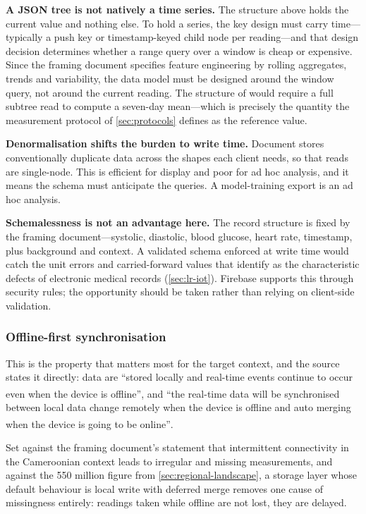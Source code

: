 \documentclass[12pt,a4paper,oneside]{report}
\newcommand{\bq}[1]{``#1''\textsuperscript{\dag}}
\begin{document}
\textbf{A JSON tree is not natively a time series.} The structure above holds the current value and nothing else. To hold a series, the key design must carry time---typically a push key or timestamp-keyed child node per reading---and that design decision determines whether a range query over a window is cheap or expensive. Since the framing document specifies feature engineering by rolling aggregates, trends and variability, the data model must be designed around the window query, not around the current reading. The structure of \textcite{efendi2025} would require a full subtree read to compute a seven-day mean---which is precisely the quantity the measurement protocol of \cref{sec:protocols} defines as the reference value.

\textbf{Denormalisation shifts the burden to write time.} Document stores conventionally duplicate data across the shapes each client needs, so that reads are single-node. This is efficient for display and poor for ad hoc analysis, and it means the schema must anticipate the queries. A model-training export is an ad hoc analysis.

\textbf{Schemalessness is not an advantage here.} The record structure is fixed by the framing document---systolic, diastolic, blood glucose, heart rate, timestamp, plus background and context. A validated schema enforced at write time would catch the unit errors and carried-forward values that \textcite{liu2025review} identify as the characteristic defects of electronic medical records (\cref{sec:lr-iot}). Firebase supports this through security rules; the opportunity should be taken rather than relying on client-side validation.

\subsubsection{Offline-first synchronisation}\label{sec:offline}

This is the property that matters most for the target context, and the source states it directly: data are \bq{stored locally and real-time events continue to occur even when the device is offline}, and \bq{the real-time data will be synchronised between local data change remotely when the device is offline and auto merging when the device is going to be online}.

Set against the framing document's statement that intermittent connectivity in the Cameroonian context leads to irregular and missing measurements, and against the 550 million figure from \cref{sec:regional-landscape}, a storage layer whose default behaviour is local write with deferred merge removes one cause of missingness entirely: readings taken while offline are not lost, they are delayed.
\end{document}
